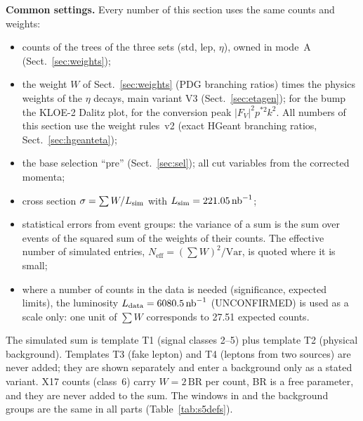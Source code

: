\textbf{Common settings.} Every number of this section uses the same counts and weights:
\begin{itemize}
\item counts of the \ppee trees of the three sets (std, lep, $\eta$), owned in mode~A
      (Sect.~\ref{sec:weights});
\item the weight $W$ of Sect.~\ref{sec:weights} (PDG branching ratios) times the physics
      weights of the $\eta$ decays, main variant V3 (Sect.~\ref{sec:etagen}); for the bump the
      KLOE-2 Dalitz plot, for the conversion peak $|F_V|^2p^{*2}k^2$. All numbers of this section
      use the weight rules~v2 (exact HGeant branching ratios, Sect.~\ref{sec:hgeanteta});
\item the base selection ``pre'' (Sect.~\ref{sec:sel}); all cut variables from the corrected momenta;
\item cross section $\sigma = \sum W/L_{\mathrm{sim}}$ with $L_{\mathrm{sim}} = 221.05\,\mathrm{nb}^{-1}$;
\item statistical errors from event groups: the variance of a sum is the sum over events of
      the squared sum of the weights of their counts. The effective number of simulated entries,
      $N_{\mathrm{eff}} = (\sum W)^2/\mathrm{Var}$, is quoted where it is small;
\item where a number of counts in the data is needed (significance, expected limits), the
      luminosity $L_{\mathrm{data}} = 6080.5\,\mathrm{nb}^{-1}$ (UNCONFIRMED) is used as a scale only: one unit of
      $\sum W$ corresponds to 27.51 expected counts.
\end{itemize}
The simulated sum is template T1 (signal classes 2--5) plus template T2 (physical background).
Templates T3 (fake lepton) and T4 (leptons from two sources) are never added; they are
shown separately and enter a background only as a stated variant. X17 counts (class~6) carry
$W = 2\,\mathrm{BR}$ per count, BR is a free parameter, and they are never added to the sum.
The windows in \Mfour and the background groups are the same in all parts
(Table~\ref{tab:s5defs}).

